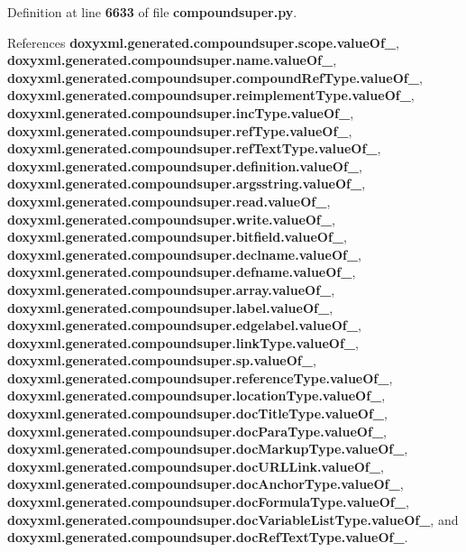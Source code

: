 Definition at line {\bf 6633} of file {\bf compoundsuper.\+py}.



References {\bf doxyxml.\+generated.\+compoundsuper.\+scope.\+value\+Of\+\_\+}, {\bf doxyxml.\+generated.\+compoundsuper.\+name.\+value\+Of\+\_\+}, {\bf doxyxml.\+generated.\+compoundsuper.\+compound\+Ref\+Type.\+value\+Of\+\_\+}, {\bf doxyxml.\+generated.\+compoundsuper.\+reimplement\+Type.\+value\+Of\+\_\+}, {\bf doxyxml.\+generated.\+compoundsuper.\+inc\+Type.\+value\+Of\+\_\+}, {\bf doxyxml.\+generated.\+compoundsuper.\+ref\+Type.\+value\+Of\+\_\+}, {\bf doxyxml.\+generated.\+compoundsuper.\+ref\+Text\+Type.\+value\+Of\+\_\+}, {\bf doxyxml.\+generated.\+compoundsuper.\+definition.\+value\+Of\+\_\+}, {\bf doxyxml.\+generated.\+compoundsuper.\+argsstring.\+value\+Of\+\_\+}, {\bf doxyxml.\+generated.\+compoundsuper.\+read.\+value\+Of\+\_\+}, {\bf doxyxml.\+generated.\+compoundsuper.\+write.\+value\+Of\+\_\+}, {\bf doxyxml.\+generated.\+compoundsuper.\+bitfield.\+value\+Of\+\_\+}, {\bf doxyxml.\+generated.\+compoundsuper.\+declname.\+value\+Of\+\_\+}, {\bf doxyxml.\+generated.\+compoundsuper.\+defname.\+value\+Of\+\_\+}, {\bf doxyxml.\+generated.\+compoundsuper.\+array.\+value\+Of\+\_\+}, {\bf doxyxml.\+generated.\+compoundsuper.\+label.\+value\+Of\+\_\+}, {\bf doxyxml.\+generated.\+compoundsuper.\+edgelabel.\+value\+Of\+\_\+}, {\bf doxyxml.\+generated.\+compoundsuper.\+link\+Type.\+value\+Of\+\_\+}, {\bf doxyxml.\+generated.\+compoundsuper.\+sp.\+value\+Of\+\_\+}, {\bf doxyxml.\+generated.\+compoundsuper.\+reference\+Type.\+value\+Of\+\_\+}, {\bf doxyxml.\+generated.\+compoundsuper.\+location\+Type.\+value\+Of\+\_\+}, {\bf doxyxml.\+generated.\+compoundsuper.\+doc\+Title\+Type.\+value\+Of\+\_\+}, {\bf doxyxml.\+generated.\+compoundsuper.\+doc\+Para\+Type.\+value\+Of\+\_\+}, {\bf doxyxml.\+generated.\+compoundsuper.\+doc\+Markup\+Type.\+value\+Of\+\_\+}, {\bf doxyxml.\+generated.\+compoundsuper.\+doc\+U\+R\+L\+Link.\+value\+Of\+\_\+}, {\bf doxyxml.\+generated.\+compoundsuper.\+doc\+Anchor\+Type.\+value\+Of\+\_\+}, {\bf doxyxml.\+generated.\+compoundsuper.\+doc\+Formula\+Type.\+value\+Of\+\_\+}, {\bf doxyxml.\+generated.\+compoundsuper.\+doc\+Variable\+List\+Type.\+value\+Of\+\_\+}, and {\bf doxyxml.\+generated.\+compoundsuper.\+doc\+Ref\+Text\+Type.\+value\+Of\+\_\+}.



